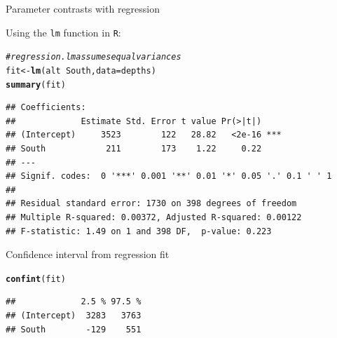 \documentclass[10pt]{beamer}\usepackage[]{graphicx}\usepackage[]{color}
\makeatletter
\newcommand{\hlcom}[1]{\textcolor[rgb]{0.678,0.584,0.686}{\textit{#1}}}%
\newcommand{\hlopt}[1]{\textcolor[rgb]{0,0,0}{#1}}%
\newcommand{\hlstd}[1]{\textcolor[rgb]{0.345,0.345,0.345}{#1}}%
\newcommand{\hlkwb}[1]{\textcolor[rgb]{0.69,0.353,0.396}{#1}}%
\newcommand{\hlkwc}[1]{\textcolor[rgb]{0.333,0.667,0.333}{#1}}%
\newcommand{\hlkwd}[1]{\textcolor[rgb]{0.737,0.353,0.396}{\textbf{#1}}}%
\newenvironment{kframe}{%
 \def\at@end@of@kframe{}%
 \ifinner\ifhmode%
  \def\at@end@of@kframe{\end{minipage}}%
  \begin{minipage}{\columnwidth}%
 \fi\fi%
 \def\FrameCommand##1{\hskip\@totalleftmargin \hskip-\fboxsep
 \colorbox{shadecolor}{##1}\hskip-\fboxsep
     \hskip-\linewidth \hskip-\@totalleftmargin \hskip\columnwidth}%
 \MakeFramed {\advance\hsize-\width
   \@totalleftmargin\z@ \linewidth\hsize
   \@setminipage}}%
 {\par\unskip\endMakeFramed%
 \at@end@of@kframe}
\newenvironment{knitrout}{}{} %
\makeatother
\begin{document}
\begin{frame}[fragile]{Parameter contrasts with regression}
	
	Using the \texttt{lm} function in \texttt{R}:
	
	
\begin{knitrout}\scriptsize
{}\color{fgcolor}\begin{kframe}
\begin{alltt}
\hlcom{# regression. lm assumes equal variances}
\hlstd{fit} \hlkwb{<-} \hlkwd{lm}\hlstd{(alt} \hlopt{~} \hlstd{South,} \hlkwc{data} \hlstd{= depths)}
\hlkwd{summary}\hlstd{(fit)}
\end{alltt}
\begin{verbatim}
## Coefficients:
##             Estimate Std. Error t value Pr(>|t|)    
## (Intercept)     3523        122   28.82   <2e-16 ***
## South            211        173    1.22     0.22    
## ---
## Signif. codes:  0 '***' 0.001 '**' 0.01 '*' 0.05 '.' 0.1 ' ' 1
## 
## Residual standard error: 1730 on 398 degrees of freedom
## Multiple R-squared: 0.00372,	Adjusted R-squared: 0.00122 
## F-statistic: 1.49 on 1 and 398 DF,  p-value: 0.223
\end{verbatim}
\end{kframe}
\end{knitrout}
	
	
\end{frame}


\begin{frame}[fragile]{Confidence interval from regression fit}
	
\begin{knitrout}\scriptsize
{}\color{fgcolor}\begin{kframe}
\begin{alltt}
\hlkwd{confint}\hlstd{(fit)}
\end{alltt}
\begin{verbatim}
##             2.5 % 97.5 %
## (Intercept)  3283   3763
## South        -129    551
\end{verbatim}
\end{kframe}
\end{knitrout}
	
	
\end{frame}
\end{document}
